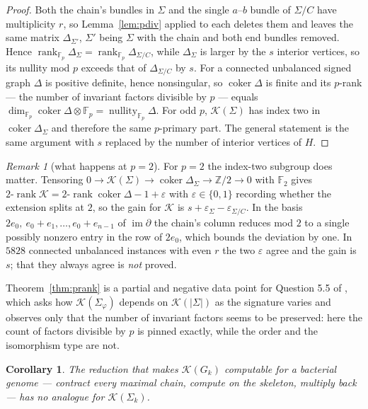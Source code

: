 \documentclass[11pt]{article}
\theoremstyle{plain}
\newtheorem{corollary}[theorem]{Corollary}
\theoremstyle{definition}
\theoremstyle{remark}
\newtheorem{remark}[theorem]{Remark}
\newcommand{\Z}{\mathbb{Z}}
\newcommand{\K}{\mathcal{K}}
\newcommand{\coker}{\operatorname{coker}}
\newcommand{\im}{\operatorname{im}}
\newcommand{\rank}{\operatorname{rank}}
\newcommand{\Sig}{\Sigma}
\begin{document}
\begin{proof}
Both the chain's bundles in $\Sig$ and the single $a$--$b$ bundle of $\Sig/C$ have
multiplicity $r$, so Lemma~\ref{lem:pdiv} applied to each deletes them and leaves the same
matrix $\Delta_{\Sig'}$, $\Sig'$ being $\Sig$ with the chain and both end bundles removed.
Hence $\rank_{\mathbb F_p}\Delta_\Sig=\rank_{\mathbb F_p}\Delta_{\Sig/C}$, while $\Delta_\Sig$
is larger by the $s$ interior vertices, so its nullity mod $p$ exceeds that of
$\Delta_{\Sig/C}$ by $s$. For a connected unbalanced signed graph $\Delta$ is positive
definite, hence nonsingular, so $\coker\Delta$ is finite and its $p$-rank --- the number of
invariant factors divisible by $p$ --- equals $\dim_{\mathbb F_p}\coker\Delta\otimes\mathbb F_p
=\operatorname{nullity}_{\mathbb F_p}\Delta$. For odd $p$, $\K(\Sig)$ has index two in
$\coker\Delta_\Sig$ and therefore the same $p$-primary part. The general statement is the
same argument with $s$ replaced by the number of interior vertices of $H$.
\end{proof}

\begin{remark}[what happens at $p=2$]\label{rem:ptwo}
For $p=2$ the index-two subgroup does matter. Tensoring
$0\to\K(\Sig)\to\coker\Delta_\Sig\to\Z/2\to0$ with $\mathbb F_2$ gives
$2\text{-}\rank\K=2\text{-}\rank\coker\Delta-1+\varepsilon$ with $\varepsilon\in\{0,1\}$
recording whether the extension splits at $2$, so the gain for $\K$ is
$s+\varepsilon_\Sig-\varepsilon_{\Sig/C}$. In the basis
$2e_0,\ e_0+e_1,\dots,e_0+e_{n-1}$ of $\im\partial$ the chain's column reduces mod $2$ to a
single possibly nonzero entry in the row of $2e_0$, which bounds the deviation by one. In
$5828$ connected unbalanced instances with even $r$ the two $\varepsilon$ agree and the gain
is $s$; that they always agree is \emph{not} proved.
\end{remark}

Theorem~\ref{thm:prank} is a partial and negative data point for Question 5.5 of
\cite{CDIOSZ}, which asks how $\K(\Sig_\varphi)$ depends on $\K(|\Sig|)$ as the signature
varies and observes only that the number of invariant factors seems to be preserved: here the
count of factors divisible by $p$ is pinned exactly, while the order and the isomorphism type
are not.

\begin{corollary}\label{cor:nocompute}
The reduction that makes $\K(G_k)$ computable for a bacterial genome --- contract every
maximal chain, compute on the skeleton, multiply back --- has no analogue for $\K(\Sig_k)$.
\end{corollary}
\end{document}
